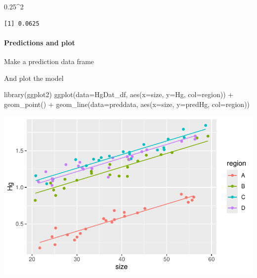 \documentclass[
  letterpaper,
  DIV=11,
  numbers=noendperiod]{scrartcl}
\let\oldparagraph\paragraph
\renewcommand{\paragraph}[1]{\oldparagraph{#1}\mbox{}}
\newenvironment{Shaded}{\begin{snugshade}}{\end{snugshade}}
\newcommand{\AttributeTok}[1]{\textcolor[rgb]{0.40,0.45,0.13}{#1}}
\newcommand{\DecValTok}[1]{\textcolor[rgb]{0.68,0.00,0.00}{#1}}
\newcommand{\FloatTok}[1]{\textcolor[rgb]{0.68,0.00,0.00}{#1}}
\newcommand{\FunctionTok}[1]{\textcolor[rgb]{0.28,0.35,0.67}{#1}}
\newcommand{\NormalTok}[1]{\textcolor[rgb]{0.00,0.23,0.31}{#1}}
\newcommand{\OtherTok}[1]{\textcolor[rgb]{0.00,0.23,0.31}{#1}}
\newcommand{\SpecialCharTok}[1]{\textcolor[rgb]{0.37,0.37,0.37}{#1}}
\begin{document}
\begin{Shaded}
\begin{Highlighting}[]
\FloatTok{0.25}\SpecialCharTok{\^{}}\DecValTok{2}
\end{Highlighting}
\end{Shaded}

\begin{verbatim}
[1] 0.0625
\end{verbatim}

\paragraph{Predictions and plot}\label{predictions-and-plot}

Make a prediction data frame

\begin{Shaded}
\end{Shaded}

And plot the model

\begin{Shaded}
\begin{Highlighting}[]
\FunctionTok{library}\NormalTok{(ggplot2)}
\FunctionTok{ggplot}\NormalTok{(}\AttributeTok{data=}\NormalTok{HgDat\_df, }\FunctionTok{aes}\NormalTok{(}\AttributeTok{x=}\NormalTok{size, }\AttributeTok{y=}\NormalTok{Hg, }\AttributeTok{col=}\NormalTok{region)) }\SpecialCharTok{+}
    \FunctionTok{geom\_point}\NormalTok{() }\SpecialCharTok{+}
    \FunctionTok{geom\_line}\NormalTok{(}\AttributeTok{data=}\NormalTok{preddata, }\FunctionTok{aes}\NormalTok{(}\AttributeTok{x=}\NormalTok{size, }\AttributeTok{y=}\NormalTok{predHg, }\AttributeTok{col=}\NormalTok{region))}
\end{Highlighting}
\end{Shaded}

\includegraphics{mixed-effects_files/figure-pdf/unnamed-chunk-11-1.pdf}
\end{document}
